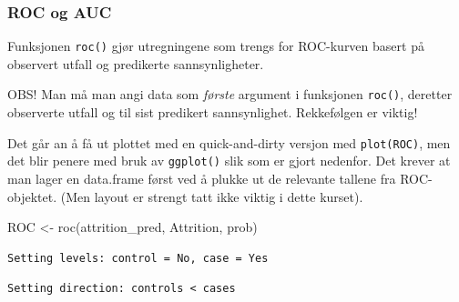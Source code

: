 \documentclass[
  letterpaper,
  DIV=11,
  numbers=noendperiod]{scrreprt}
\newenvironment{Shaded}{\begin{snugshade}}{\end{snugshade}}
\newcommand{\AttributeTok}[1]{\textcolor[rgb]{0.40,0.45,0.13}{#1}}
\newcommand{\DecValTok}[1]{\textcolor[rgb]{0.68,0.00,0.00}{#1}}
\newcommand{\FunctionTok}[1]{\textcolor[rgb]{0.28,0.35,0.67}{#1}}
\newcommand{\NormalTok}[1]{\textcolor[rgb]{0.00,0.23,0.31}{#1}}
\newcommand{\OtherTok}[1]{\textcolor[rgb]{0.00,0.23,0.31}{#1}}
\newcommand{\SpecialCharTok}[1]{\textcolor[rgb]{0.37,0.37,0.37}{#1}}
\newcommand{\StringTok}[1]{\textcolor[rgb]{0.13,0.47,0.30}{#1}}
\theoremstyle{definition}
\theoremstyle{remark}
\begin{document}
\hypertarget{roc-og-auc-1}{%
\subsubsection{ROC og AUC}\label{roc-og-auc-1}}

Funksjonen \texttt{roc()} gjør utregningene som trengs for ROC-kurven
basert på observert utfall og predikerte sannsynligheter.

OBS! Man må man angi data som \emph{første} argument i funksjonen
\texttt{roc()}, deretter observerte utfall og til sist predikert
sannsynlighet. Rekkefølgen er viktig!

Det går an å få ut plottet med en quick-and-dirty versjon med
\texttt{plot(ROC)}, men det blir penere med bruk av \texttt{ggplot()}
slik som er gjort nedenfor. Det krever at man lager en data.frame først
ved å plukke ut de relevante tallene fra ROC-objektet. (Men layout er
strengt tatt ikke viktig i dette kurset).

\begin{Shaded}
\begin{Highlighting}[]
\NormalTok{ROC }\OtherTok{\textless{}{-}} \FunctionTok{roc}\NormalTok{(attrition\_pred, Attrition, prob)}
\end{Highlighting}
\end{Shaded}

\begin{verbatim}
Setting levels: control = No, case = Yes
\end{verbatim}

\begin{verbatim}
Setting direction: controls < cases
\end{verbatim}

\begin{Shaded}
\end{Shaded}
\end{document}
